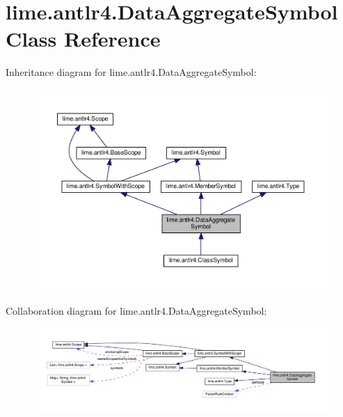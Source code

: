 \hypertarget{classlime_1_1antlr4_1_1DataAggregateSymbol}{}\section{lime.\+antlr4.\+Data\+Aggregate\+Symbol Class Reference}
\label{classlime_1_1antlr4_1_1DataAggregateSymbol}


Inheritance diagram for lime.\+antlr4.\+Data\+Aggregate\+Symbol\+:
\nopagebreak
\begin{figure}[H]
\begin{center}
\leavevmode
\includegraphics[width=350pt]{classlime_1_1antlr4_1_1DataAggregateSymbol__inherit__graph}
\end{center}
\end{figure}


Collaboration diagram for lime.\+antlr4.\+Data\+Aggregate\+Symbol\+:
\nopagebreak
\begin{figure}[H]
\begin{center}
\leavevmode
\includegraphics[width=350pt]{classlime_1_1antlr4_1_1DataAggregateSymbol__coll__graph}
\end{center}
\end{figure}
